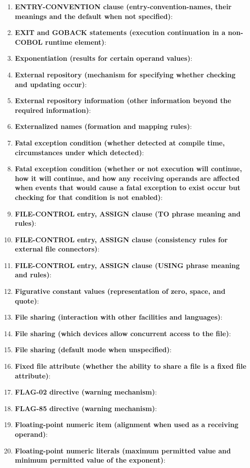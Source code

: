 \begin{enumerate}
\item \textbf{ENTRY-CONVENTION clause (entry-convention-names, their meanings and the default when not specified)}:
\item \textbf{EXIT and GOBACK statements (execution continuation in a non-COBOL runtime element)}:
\item \textbf{Exponentiation (results for certain operand values)}:
\item \textbf{External repository (mechanism for specifying whether checking and updating occur)}:
\item \textbf{External repository information (other information beyond the required information)}:
\item \textbf{Externalized names (formation and mapping rules)}:
\item \textbf{Fatal exception condition (whether detected at compile time, circumstances under which detected)}:
\item \textbf{Fatal exception condition (whether or not execution will continue, how it will continue, and how any receiving operands are affected when events that would cause a fatal exception to exist occur but checking for that condition is not enabled)}:
\item \textbf{FILE-CONTROL entry, ASSIGN clause (TO phrase meaning and rules)}:
\item \textbf{FILE-CONTROL entry, ASSIGN clause (consistency rules for external file connectors)}:
\item \textbf{FILE-CONTROL entry, ASSIGN clause (USING phrase meaning and rules)}:
\item \textbf{Figurative constant values (representation of zero, space, and quote)}:
\item \textbf{File sharing (interaction with other facilities and languages)}:
\item \textbf{File sharing (which devices allow concurrent access to the file)}:
\item \textbf{File sharing (default mode when unspecified)}:
\item \textbf{Fixed file attribute (whether the ability to share a file is a fixed file attribute)}:
\item \textbf{FLAG-02 directive (warning mechanism)}:
\item \textbf{FLAG-85 directive (warning mechanism)}:
\item \textbf{Floating-point numeric item (alignment when used as a receiving operand)}:
\item \textbf{Floating-point numeric literals (maximum permitted value and minimum permitted value of the exponent)}:

\end{enumerate}
